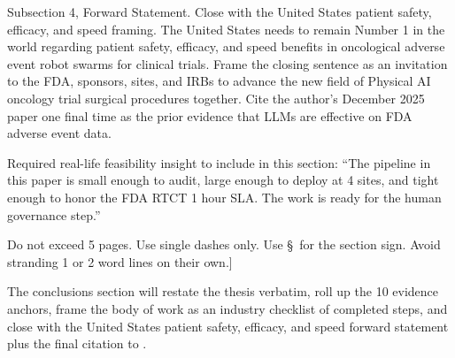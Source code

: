 \begin{sectionaccent}
Subsection 4, Forward Statement. Close with the United States
patient safety, efficacy, and speed framing. The United States needs
to remain Number 1 in the world regarding patient safety, efficacy,
and speed benefits in oncological adverse event robot swarms for
clinical trials. Frame the closing sentence as an invitation to the
FDA, sponsors, sites, and IRBs to advance the new field of Physical
AI oncology trial surgical procedures together. Cite the author's
December 2025 paper
 one final time as the prior
evidence that LLMs are effective on FDA adverse event data.

Required real-life feasibility insight to include in this section:
``The pipeline in this paper is small enough to audit, large enough
to deploy at 4 sites, and tight enough to honor the FDA RTCT 1 hour
SLA. The work is ready for the human governance step.''

Do not exceed 5 pages. Use single dashes only. Use \S\ for the
section sign. Avoid stranding 1 or 2 word lines on their own.]

The conclusions section will restate the thesis verbatim, roll up the
10 evidence anchors, frame the body of work as an industry checklist
of completed steps, and close with the United States patient safety,
efficacy, and speed forward statement plus the final citation to
.


\end{sectionaccent}
